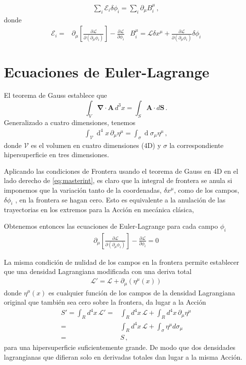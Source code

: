 \begin{align}
  \sum_i \mathcal{E}_i \delta\phi_i = \sum_i \partial_{\mu} B^{\mu}_{i}\,,
\end{align}
donde
\begin{align}
\label{eq:master2}
  \mathcal{E}_i=&\partial_{\mu} \left[ \frac{\partial\mathcal{L}}{\partial(\partial_{\mu}\phi_i)}\right]-\frac{\partial\mathcal{L}}{\partial\phi_i} & B^{\mu}_i=\mathcal{L} \delta x^{\mu} + \frac{\partial\mathcal{L}}{\partial(\partial_{\mu}\phi_i)}\delta\phi_{i} 
\end{align}


\section{Ecuaciones de Euler-Lagrange}
El teorema de Gauss establece que
\begin{equation}
\int_V\boldsymbol{\nabla}\cdot\mathbf{A}\,d^3x=
 \int_S\mathbf{A}\cdot d\mathbf{S}\,.
\end{equation}
Generalizado a cuatro dimensiones, tenemos
\begin{align}
\int_{\mathcal{V}} \operatorname{d}^4x\,\partial_{\mu} \eta^{\mu}=
\int_{\sigma} \operatorname{d}\sigma_{\mu} \eta^{\mu}\,,   
\end{align}
donde $\mathcal{V}$ es el volumen en cuatro dimensiones (4D) y $\sigma$ la correspondiente hipersuperficie en tres dimensiones.

Aplicando las condiciones de Frontera usando  el teorema de Gauss en 4D en el lado derecho de \eqref{eq:masterint},
es claro que la integral de frontera se anula si imponemos que la variación tanto de la coordenadas, $\delta x^{\mu}$, como de los campos, $\delta \phi_{i}$ , en la frontera se hagan cero. Esto es equivalente a la anulación de las trayectorias en los extremos para la Acción en mecánica clásica, 

Obtenemos entonces las ecuaciones de Euler-Lagrange para cada campo $\phi_i$
\begin{align}
\label{eq:eelcallfmu}
  \partial_{\mu} \left[ \frac{\partial\mathcal{L}}{\partial(\partial_{\mu}\phi_i)}\right]-\frac{\partial\mathcal{L}}{\partial\phi_i}=0
\end{align}

La misma condición de nulidad de los campos en la frontera permite establecer que una densidad Lagrangiana modificada con una deriva total
\begin{align}
  \mathcal{L}'=\mathcal{L}+\partial_\mu(\eta^{\mu}(x))
\end{align}
donde $\eta^{\mu}(x)$ es cualquier función de los campos de la densidad Lagrangiana original que también sea cero sobre la frontera, da lugar a la Acci\'on
\begin{align}
  S'=\int_{R}d^4x\,\mathcal{L}'=&\int_{R}d^4x\,\mathcal{L}+\int_R d^4x\,\partial_\mu\eta^{\mu}\nonumber\\
  =&\int_{R}d^4x\,\mathcal{L}+\int_\sigma \eta^{\mu} d\sigma_{\mu}\nonumber\\
  =&S\,,
\end{align}
para una hipersuperficie suficientemente grande. De modo que dos densidades lagrangianas que difieran solo en derivadas totales dan lugar a la misma Acci\'on.

